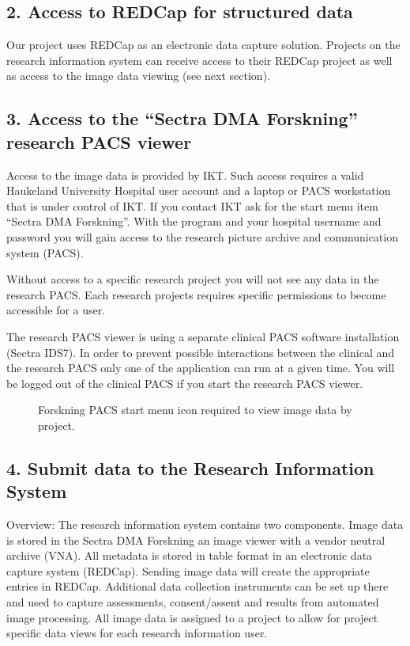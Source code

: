 \documentclass[letterpaper,10pt,english]{sphinxmanual}
\let\sphinxpxdimen\pdfpxdimen\else\newdimen\sphinxpxdimen
\begin{document}
\subsection{2. Access to REDCap for structured data}
\label{\detokenize{EndUser/end-user:access-to-redcap-for-structured-data}}
\sphinxAtStartPar
Our project uses REDCap as an electronic data capture solution. Projects on the research information system can receive access to their REDCap project as well as access to the image data viewing (see next section).


\subsection{3. Access to the “Sectra DMA Forskning” research PACS viewer}
\label{\detokenize{EndUser/end-user:access-to-the-sectra-dma-forskning-research-pacs-viewer}}
\sphinxAtStartPar
Access to the image data is provided by IKT. Such access requires a valid Haukeland University Hospital user account and a laptop or PACS workstation that is under control of IKT. If you contact IKT ask for the start menu item “Sectra DMA Forskning”. With the program and your hospital username and password you will gain access to the research picture archive and communication system (PACS).

\sphinxAtStartPar
Without access to a specific research project you will not see any data in the research PACS. Each research projects requires specific permissions to become accessible for a user.

\sphinxAtStartPar
The research PACS viewer is using a separate clinical PACS software installation (Sectra IDS7). In order to prevent possible interactions between the clinical and the research PACS only one of the application can run at a given time. You will be logged out of the clinical PACS if you start the research PACS viewer.

\begin{figure}[htbp]
\centering
\capstart

\noindent\sphinxincludegraphics[width=268\sphinxpxdimen,height=451\sphinxpxdimen]{{ikt-sectra-dma-forskning}.png}
\caption{Forskning PACS start menu icon required to view image data by project.}\label{\detokenize{EndUser/end-user:id2}}\end{figure}


\subsection{4. Submit data to the Research Information System}
\label{\detokenize{EndUser/end-user:submit-data-to-the-research-information-system}}
\sphinxAtStartPar
Overview: The research information system contains two components. Image data is stored in the Sectra DMA Forskning \sphinxhyphen{} an image viewer with a vendor neutral archive (VNA). All meta\sphinxhyphen{}data is stored in table format in an electronic data capture system (REDCap). Sending image data will create the appropriate entries in REDCap. Additional data collection instruments can be set up there and used to capture assessments, consent/assent and results from automated image processing. All image data is assigned to a project to allow for project specific data views for each research information user.
\end{document}
